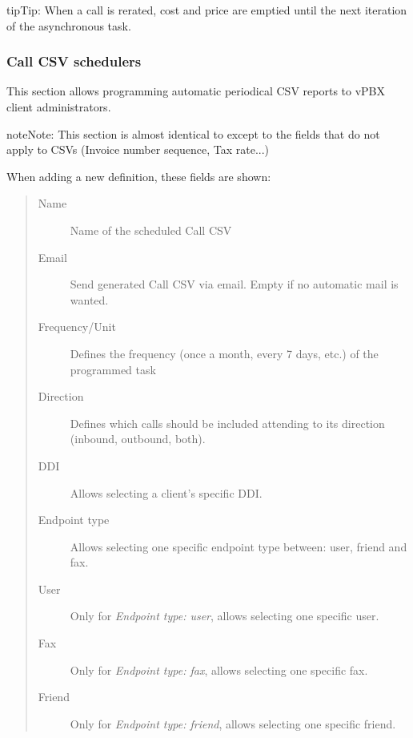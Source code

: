 \documentclass[letterpaper,10pt,english]{sphinxmanual}
\begin{document}
\begin{notice}{tip}{Tip:}
When a call is rerated, cost and price are emptied until the next iteration of the asynchronous task.
\end{notice}


\subsubsection{Call CSV schedulers}
\label{administration_portal/client/vpbx/calls/call_csv_schedulers:call-csv-schedulers}\label{administration_portal/client/vpbx/calls/call_csv_schedulers::doc}
This section allows programming automatic periodical CSV reports to vPBX client administrators.

\begin{notice}{note}{Note:}
This section is almost identical to {\hyperref[administration_portal/brand/invoicing/invoice_schedulers:invoice\string-schedulers]{}} except to the
fields that do not apply to CSVs (Invoice number sequence, Tax rate...)
\end{notice}

When adding a new definition, these fields are shown:
\begin{quote}
\begin{description}
\item[{Name}] \leavevmode
Name of the scheduled Call CSV

\item[{Email}] \leavevmode
Send generated Call CSV via email. Empty if no automatic mail is wanted.

\item[{Frequency/Unit}] \leavevmode
Defines the frequency (once a month, every 7 days, etc.) of the programmed task

\item[{Direction}] \leavevmode
Defines which calls should be included attending to its direction (inbound, outbound, both).

\item[{DDI}] \leavevmode
Allows selecting a client's specific DDI.

\item[{Endpoint type}] \leavevmode
Allows selecting one specific endpoint type between: user, friend and fax.

\item[{User}] \leavevmode
Only for \emph{Endpoint type: user}, allows selecting one specific user.

\item[{Fax}] \leavevmode
Only for \emph{Endpoint type: fax}, allows selecting one specific fax.

\item[{Friend}] \leavevmode
Only for \emph{Endpoint type: friend}, allows selecting one specific friend.

\end{description}
\end{quote}
\end{document}
